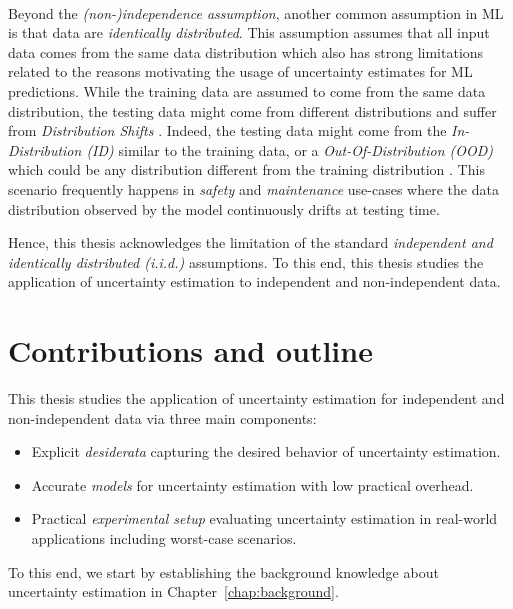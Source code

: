 \paragraph*{} Beyond the \emph{(non-)independence assumption}, another common assumption in ML is that data are \emph{identically distributed}. 
This assumption assumes that all input data comes from the same data distribution which also has strong limitations related to the reasons motivating the usage of uncertainty estimates for ML predictions.
While the training data are assumed to come from the same data distribution, the testing data might come from different distributions and suffer from \emph{Distribution Shifts} \cite{rabanser2019shift, dataset-shif}. 
Indeed, the testing data might come from the \emph{In-Distribution (ID)} similar to the training data, or a \emph{Out-Of-Distribution (OOD)} which could be any distribution different from the training distribution \cite{ood-detection-survey, shen2021ood}.
This scenario frequently happens in \emph{safety} and \emph{maintenance} use-cases where the data distribution observed by the model continuously drifts at testing time. 

Hence, this thesis acknowledges the limitation of the standard \emph{independent and identically distributed (i.i.d.)} assumptions.
To this end, this thesis studies the application of uncertainty estimation to independent and non-independent data.

\section{Contributions and outline}

This thesis studies the application of uncertainty estimation for independent and non-independent data via three main components:
\begin{itemize}
    \item Explicit \emph{desiderata} capturing the desired behavior of uncertainty estimation.
    \item Accurate \emph{models} for uncertainty estimation with low practical overhead.
    \item Practical \emph{experimental setup} evaluating uncertainty estimation in real-world applications including worst-case scenarios.
\end{itemize} 

To this end, we start by establishing the background knowledge about uncertainty estimation in Chapter~\ref{chap:background}.

